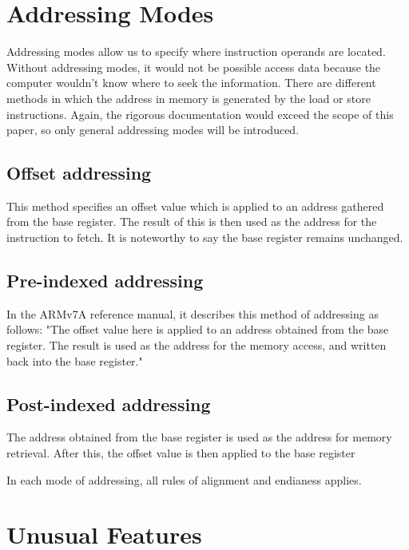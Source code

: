 \documentclass[12pt]{scrreprt}
\begin{document}
{\let\clearpage\relax\chapter{Addressing Modes}}

	Addressing modes allow us to specify where instruction operands are located.
	Without addressing modes, it would not be possible access data because the computer wouldn't know where to seek the information.
	There are different methods in which the address in memory is generated by the load or store instructions.
	Again, the rigorous documentation would exceed the scope of this paper, so only general addressing modes will be introduced.
	
	\section{Offset addressing}
		This method specifies an offset value which is applied to an address gathered from the base register.
		The result of this is then used as the address for the instruction to fetch.
		It is noteworthy to say the base register remains unchanged.

	\section{Pre-indexed addressing}
		In the ARMv7A reference manual, it describes this method of addressing as follows:
		"The offset value here is applied to an address obtained from the base register.
		The result is used as the address for the memory access, and written back into the base register."

	\section{Post-indexed addressing}
		The address obtained from the base register is used as the address for memory retrieval.
		After this, the offset value is then applied to the base register

In each mode of addressing, all rules of alignment and endianess applies.

{\let\clearpage\relax\chapter{Unusual Features}}
\end{document}
